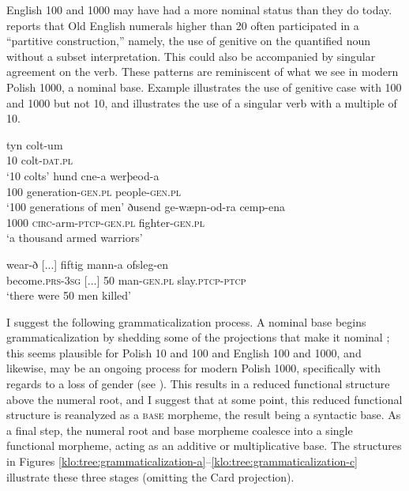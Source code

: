 \documentclass[output=paper]{langscibook}
\begin{document}
English 100 and 1000 may have had a more nominal status than they do today.  reports that Old English numerals higher than 20 often participated in a ``partitive construction,'' namely, the use of genitive on the quantified noun without a subset interpretation. This could also be accompanied by singular agreement on the verb. These patterns are reminiscent of what we see in modern Polish 1000, a nominal base. Example  illustrates the use of genitive case with 100 and 1000 but not 10, and  illustrates the use of a singular verb with a multiple of 10.

\ea \label{klo:ex:old100,1000gen,not10}
\ea \gll tyn colt-um\\
10 colt-\textsc{dat.pl}\\
\glt `10 colts'\hfill\citep[219]{von2010cardinal}
\ex \gll hund cne-a werþeod-a\\
100 generation-\textsc{gen.pl} people-\textsc{gen.pl}\\
\glt `100 generations of men'\hfill\citep[220]{von2010cardinal}
\ex \gll ðusend ge-wæpn-od-ra cemp-ena\\
1000 \textsc{circ}-arm-\textsc{ptcp-gen.pl} fighter-\textsc{gen.pl}\\
\glt `a thousand armed warriors' \hfill\citep[220]{von2010cardinal}
\z \z

\ea \label{klo:ex:oldEngagr}
\gll wear-ð [...] fiftig mann-a ofsleg-en\\
become.\textsc{prs-3sg} [...] 50 man-\textsc{gen.pl} slay.\textsc{ptcp-ptcp} \\
\glt `there were 50 men killed' \hfill\citep[224]{von2010cardinal}
\z

\noindent I suggest the following grammaticalization process. A nominal base begins grammaticalization by shedding some of the projections that make it nominal \citep[see][]{miechowicz2014hist}; this seems plausible for Polish 10 and 100 and English 100 and 1000, and likewise, may be an ongoing process for modern Polish 1000, specifically with regards to a loss of gender (see ). This results in a reduced functional structure above the numeral root, and I suggest that at some point, this reduced functional structure is reanalyzed as a \textsc{base} morpheme, the result being a syntactic base. As a final step, the numeral root and base morpheme coalesce into a single functional morpheme, acting as an additive or multiplicative base. The structures in Figures \ref{klo:tree:grammaticalization-a}--\ref{klo:tree:grammaticalization-c} illustrate these three stages (omitting the Card projection).
\end{document}
